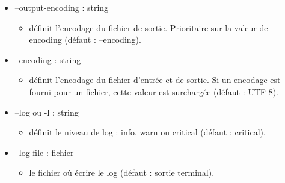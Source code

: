 \documentclass[manual-fr.tex]{subfiles}
\begin{document}
\begin{itemize}
\begin{itemize}
\begin{itemize}
                \end{itemize}
            \item[] --output-encoding : string
                \begin{itemize}
                    \item[] définit l'encodage du fichier de sortie. Prioritaire sur la valeur de --encoding (défaut : --encoding).
                \end{itemize}
            \item[] --encoding : string
                \begin{itemize}
                    \item[] définit l'encodage du fichier d'entrée et de sortie. Si un encodage est fourni pour un fichier,
                        cette valeur est surchargée (défaut : UTF-8).
                \end{itemize}
            \item[] --log ou -l : string
                \begin{itemize}
                    \item[] définit le niveau de log : info, warn ou critical (défaut : critical).
                \end{itemize}
            \item[] --log-file : fichier
                \begin{itemize}
                    \item[] le fichier où écrire le log (défaut : sortie terminal).
                \end{itemize}
        \end{itemize}
\end{itemize}
\end{document}
